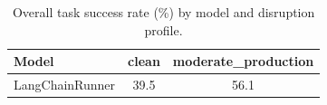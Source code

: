 \begin{table}[h]
\centering
\caption{Overall task success rate (\%) by model and disruption profile.}
\label{tab:overall-success}
\begin{tabular}{lcc}
\toprule
\textbf{Model} & \textbf{clean} & \textbf{moderate_production} \\
\midrule
LangChainRunner & 39.5 & 56.1 \\
\bottomrule
\end{tabular}
\end{table}
